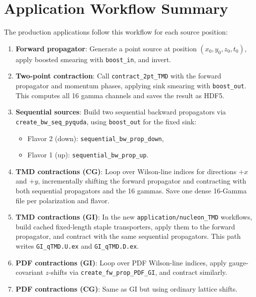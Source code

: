 \documentclass[11pt,a4paper]{article}
\begin{document}
\section{Application Workflow Summary}
\label{sec:workflow}

The production applications follow this workflow for each source position:

\begin{enumerate}
  \item \textbf{Forward propagator}: Generate a point source at position
    $(x_0, y_0, z_0, t_0)$, apply boosted smearing with
    \texttt{boost\_in}, and invert.
  \item \textbf{Two-point contraction}: Call \texttt{contract\_2pt\_TMD} with the
    forward propagator and momentum phases, applying sink smearing with
    \texttt{boost\_out}. This computes all 16 gamma channels and saves the
    result as HDF5.
  \item \textbf{Sequential sources}: Build two sequential backward propagators
    via \texttt{create\_bw\_seq\_pyquda}, using \texttt{boost\_out} for the
    fixed sink:
    \begin{itemize}
      \item Flavor 2 (down): \texttt{sequential\_bw\_prop\_down},
      \item Flavor 1 (up): \texttt{sequential\_bw\_prop\_up}.
    \end{itemize}
  \item \textbf{TMD contractions (CG)}: Loop over Wilson-line indices for
    directions $+x$ and $+y$, incrementally shifting the forward propagator
    and contracting with both sequential propagators and the 16 gammas.
    Save one dense 16-Gamma file per polarization and flavor.
  \item \textbf{TMD contractions (GI)}: In the new
    \texttt{application/nucleon\_TMD} workflows, build cached fixed-length
    staple transporters, apply them to the forward propagator, and contract
    with the same sequential propagators.  This path writes
    \texttt{GI\_qTMD.U.ex} and \texttt{GI\_qTMD.D.ex}.
  \item \textbf{PDF contractions (GI)}: Loop over PDF Wilson-line indices,
    apply gauge-covariant $z$-shifts via \texttt{create\_fw\_prop\_PDF\_GI},
    and contract similarly.
  \item \textbf{PDF contractions (CG)}: Same as GI but using ordinary lattice
    shifts.
\end{enumerate}
\end{document}
